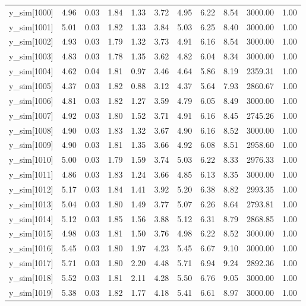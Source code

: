 \begin{table}[ht]
\begin{tabular}{rrrrrrrrrrr}
  y\_sim[1000] & 4.96 & 0.03 & 1.84 & 1.33 & 3.72 & 4.95 & 6.22 & 8.54 & 3000.00 & 1.00 \\ 
  y\_sim[1001] & 5.01 & 0.03 & 1.82 & 1.33 & 3.84 & 5.03 & 6.25 & 8.40 & 3000.00 & 1.00 \\ 
  y\_sim[1002] & 4.93 & 0.03 & 1.79 & 1.32 & 3.73 & 4.91 & 6.16 & 8.54 & 3000.00 & 1.00 \\ 
  y\_sim[1003] & 4.83 & 0.03 & 1.78 & 1.35 & 3.62 & 4.82 & 6.04 & 8.34 & 3000.00 & 1.00 \\ 
  y\_sim[1004] & 4.62 & 0.04 & 1.81 & 0.97 & 3.46 & 4.64 & 5.86 & 8.19 & 2359.31 & 1.00 \\ 
  y\_sim[1005] & 4.37 & 0.03 & 1.82 & 0.88 & 3.12 & 4.37 & 5.64 & 7.93 & 2860.67 & 1.00 \\ 
  y\_sim[1006] & 4.81 & 0.03 & 1.82 & 1.27 & 3.59 & 4.79 & 6.05 & 8.49 & 3000.00 & 1.00 \\ 
  y\_sim[1007] & 4.92 & 0.03 & 1.80 & 1.52 & 3.71 & 4.91 & 6.16 & 8.45 & 2745.26 & 1.00 \\ 
  y\_sim[1008] & 4.90 & 0.03 & 1.83 & 1.32 & 3.67 & 4.90 & 6.16 & 8.52 & 3000.00 & 1.00 \\ 
  y\_sim[1009] & 4.90 & 0.03 & 1.81 & 1.35 & 3.66 & 4.92 & 6.08 & 8.51 & 2958.60 & 1.00 \\ 
  y\_sim[1010] & 5.00 & 0.03 & 1.79 & 1.59 & 3.74 & 5.03 & 6.22 & 8.33 & 2976.33 & 1.00 \\ 
  y\_sim[1011] & 4.86 & 0.03 & 1.83 & 1.24 & 3.66 & 4.85 & 6.13 & 8.35 & 3000.00 & 1.00 \\ 
  y\_sim[1012] & 5.17 & 0.03 & 1.84 & 1.41 & 3.92 & 5.20 & 6.38 & 8.82 & 2993.35 & 1.00 \\ 
  y\_sim[1013] & 5.04 & 0.03 & 1.80 & 1.49 & 3.77 & 5.07 & 6.26 & 8.64 & 2793.81 & 1.00 \\ 
  y\_sim[1014] & 5.12 & 0.03 & 1.85 & 1.56 & 3.88 & 5.12 & 6.31 & 8.79 & 2868.85 & 1.00 \\ 
  y\_sim[1015] & 4.98 & 0.03 & 1.81 & 1.50 & 3.76 & 4.98 & 6.22 & 8.52 & 3000.00 & 1.00 \\ 
  y\_sim[1016] & 5.45 & 0.03 & 1.80 & 1.97 & 4.23 & 5.45 & 6.67 & 9.10 & 3000.00 & 1.00 \\ 
  y\_sim[1017] & 5.71 & 0.03 & 1.80 & 2.20 & 4.48 & 5.71 & 6.94 & 9.24 & 2892.36 & 1.00 \\ 
  y\_sim[1018] & 5.52 & 0.03 & 1.81 & 2.11 & 4.28 & 5.50 & 6.76 & 9.05 & 3000.00 & 1.00 \\ 
  y\_sim[1019] & 5.38 & 0.03 & 1.82 & 1.77 & 4.18 & 5.41 & 6.61 & 8.97 & 3000.00 & 1.00 \\ 

\end{tabular}
\end{table}
